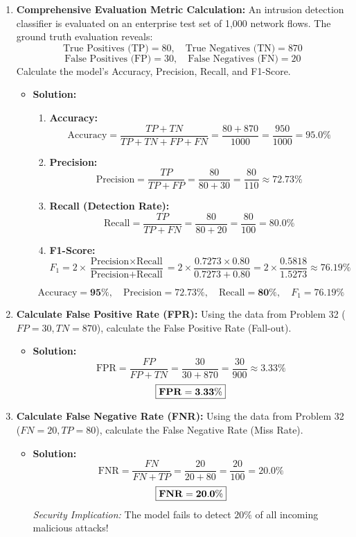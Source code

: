 \begin{enumerate}[label=\textbf{Problem \arabic*.,resume},leftmargin=1.5cm]
\item \textbf{Comprehensive Evaluation Metric Calculation:}
An intrusion detection classifier is evaluated on an enterprise test set of 1,000 network flows. The ground truth evaluation reveals:
\[ \text{True Positives (TP)} = 80, \quad \text{True Negatives (TN)} = 870 \]
\[ \text{False Positives (FP)} = 30, \quad \text{False Negatives (FN)} = 20 \]
Calculate the model's Accuracy, Precision, Recall, and F1-Score.
\begin{itemize}
\item \textbf{Solution:}
\begin{enumerate}
\item \textbf{Accuracy:}
\[ \text{Accuracy} = \frac{TP + TN}{TP + TN + FP + FN} = \frac{80 + 870}{1000} = \frac{950}{1000} = \mathbf{95.0\%} \]
\item \textbf{Precision:}
\[ \text{Precision} = \frac{TP}{TP + FP} = \frac{80}{80 + 30} = \frac{80}{110} \approx \mathbf{72.73\%} \]
\item \textbf{Recall (Detection Rate):}
\[ \text{Recall} = \frac{TP}{TP + FN} = \frac{80}{80 + 20} = \frac{80}{100} = \mathbf{80.0\%} \]
\item \textbf{F1-Score:}
\[ F_1 = 2 \times \frac{\text{Precision} \times \text{Recall}}{\text{Precision} + \text{Recall}} = 2 \times \frac{0.7273 \times 0.80}{0.7273 + 0.80} = 2 \times \frac{0.5818}{1.5273} \approx \mathbf{76.19\%} \]
\end{enumerate}
\[ \boxed{\text{Accuracy} = \mathbf{95\%}, \quad \text{Precision} = \mathbf{72.73\%}, \quad \text{Recall} = \mathbf{80\%}, \quad F_1 = \mathbf{76.19\%}} \]
\end{itemize}

\item \textbf{Calculate False Positive Rate (FPR):}
Using the data from Problem 32 ($FP = 30, TN = 870$), calculate the False Positive Rate (Fall-out).
\begin{itemize}
\item \textbf{Solution:}
\[ \text{FPR} = \frac{FP}{FP + TN} = \frac{30}{30 + 870} = \frac{30}{900} \approx \mathbf{3.33\%} \]
\[ \boxed{\text{\textbf{FPR}} = \mathbf{3.33\%}} \]
\end{itemize}

\item \textbf{Calculate False Negative Rate (FNR):}
Using the data from Problem 32 ($FN = 20, TP = 80$), calculate the False Negative Rate (Miss Rate).
\begin{itemize}
\item \textbf{Solution:}
\[ \text{FNR} = \frac{FN}{FN + TP} = \frac{20}{20 + 80} = \frac{20}{100} = \mathbf{20.0\%} \]
\[ \boxed{\text{\textbf{FNR}} = \mathbf{20.0\%}} \]
\textit{Security Implication:} The model fails to detect $20\%$ of all incoming malicious attacks!
\end{itemize}


\end{enumerate}
